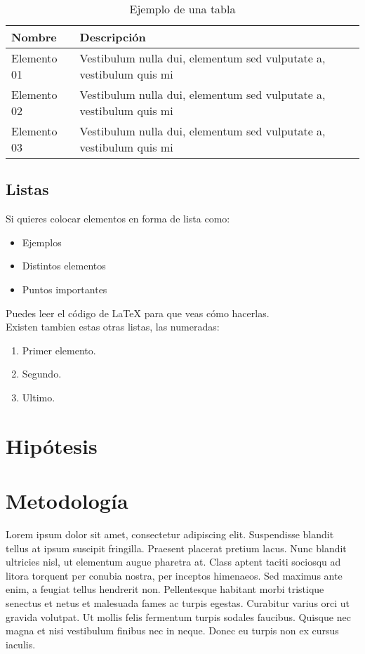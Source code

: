 \documentclass[a4paper, 11pt]{article}
\begin{document}
\begin{table}[H]
\begin{center}
\begin{tabular}{| p{3cm} | p{7cm} |}
\hline
	Nombre & Descripción \\ \hline
	Elemento 01 & Vestibulum nulla dui, elementum sed vulputate a, vestibulum quis mi\\
	Elemento 02 & Vestibulum nulla dui, elementum sed vulputate a, vestibulum quis mi \\
	Elemento 03 & Vestibulum nulla dui, elementum sed vulputate a, vestibulum quis mi  \\ \hline
\end{tabular}
\caption{Ejemplo de una tabla}
\label{table:Tabla}
\end{center}
\end{table}

\subsection{Listas}
Si quieres colocar elementos en forma de lista como: 
\begin{itemize}
 \item{Ejemplos}
 \item{Distintos elementos}	
 \item{Puntos importantes}
\end{itemize}
Puedes leer el código de {\LaTeX} para que veas cómo hacerlas. \\

Existen tambien estas otras listas, las numeradas: 
\begin{enumerate}
	\item Primer elemento.
	\item Segundo.
	\item Ultimo.
\end{enumerate}


\section{Hipótesis}\label{Hipot}
%

\section{Metodología}\label{Metod}
%
Lorem ipsum dolor sit amet, consectetur adipiscing elit. Suspendisse blandit tellus at ipsum suscipit fringilla. Praesent placerat pretium lacus. Nunc blandit ultricies nisl, ut elementum augue pharetra at. Class aptent taciti sociosqu ad litora torquent per conubia nostra, per inceptos himenaeos. Sed maximus ante enim, a feugiat tellus hendrerit non. Pellentesque habitant morbi tristique senectus et netus et malesuada fames ac turpis egestas. Curabitur varius orci ut gravida volutpat. Ut mollis felis fermentum turpis sodales faucibus. Quisque nec magna et nisi vestibulum finibus nec in neque. Donec eu turpis non ex cursus iaculis. 
\end{document}
